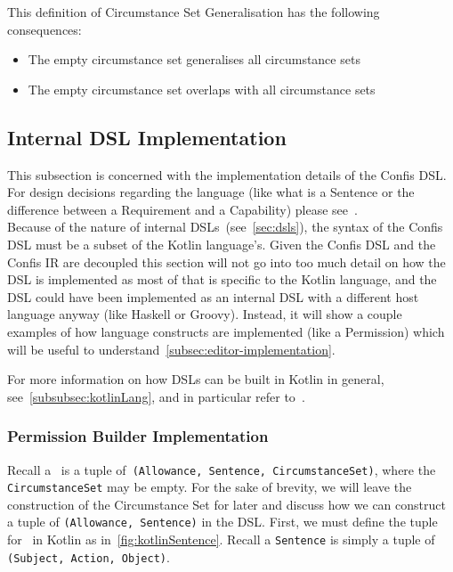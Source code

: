 This definition of Circumstance Set Generalisation has the following consequences:
\begin{itemize}
    \item The empty circumstance set generalises all circumstance sets
    \item The empty circumstance set overlaps with all circumstance sets
\end{itemize}

\subsection{Internal DSL Implementation}\label{subsec:dsl-implementation}

This subsection is concerned with the implementation details of the Confis DSL.
For design decisions regarding the language (like what is a Sentence or the difference between a Requirement and a Capability) please see~.\\

Because of the nature of internal DSLs~(see~\autoref{sec:dsls}), the syntax of the Confis DSL must be a subset of the Kotlin language's.
Given the Confis DSL and the Confis IR are decoupled this section will not go into too much detail on how the DSL is implemented as most of that is specific to the Kotlin language, and the DSL could have been implemented as an internal DSL with a different host language anyway (like Haskell or Groovy).
Instead, it will show a couple examples of how language constructs are implemented (like a Permission) which will be useful to understand~\autoref{subsec:editor-implementation}.

For more information on how DSLs can be built in Kotlin in general, see~\autoref{subsubsec:kotlinLang}, and in particular refer to~\cite{kotlinTypeSafeBuilders}.

\subsubsection{Permission Builder Implementation}

Recall a~ is a tuple of~\texttt{(Allowance, Sentence, CircumstanceSet)}, where the \texttt{CircumstanceSet} may be empty.
For the sake of brevity, we will leave the construction of the Circumstance Set for later and discuss how we can construct a tuple of \texttt{(Allowance, Sentence)} in the DSL.
First, we must define the tuple for~ in Kotlin as in~\autoref{fig:kotlinSentence}.
Recall a \texttt{Sentence} is simply a tuple of \texttt{(Subject, Action, Object)}.

